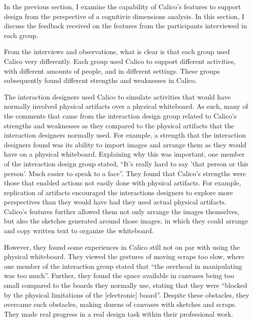 \documentclass[12pt,fleqn]{ucithesis}
\begin{document}
In the previous section, I examine the capability of Calico's features to support design from the perspective of a cognitivie dimensions analysis. In this section, I discuss the feedback received on the features from the participants interviewed in each group.

From the interviews and observations, what is clear is that each group used Calico very differently. Each group used Calico to support different activities, with different amounts of people, and in different settings. These groups subsequently found different strengths and weaknesses in Calico.

The interaction designers used Calico to simulate activities that would have normally involved physical artifacts over a physical whiteboard. As such, many of the comments that came from the interaction design group related to Calico's strengths and weaknesses as they compared to the physical artifacts that the interaction designers normally used. For example, a strength that the interaction designers found was its ability to import images and arrange them as they would have on a physical whiteboard. Explaining why this was important, one member of the interaction design group stated, ``It's really hard to say 'that person or this person'. Much easier to speak to a face''. They found that Calico's strengths were those that enabled actions not easily done with physical artifacts. For example, replication of artifacts encouraged the interactions designers to explore more perspectives than they would have had they used actual physical artifacts. Calico's features further allowed them not only arrange the images themselves, but also the sketches generated around those images, in which they could arrange and copy written text to organize the whiteboard. 

However, they found some experiences in Calico still not on par with using the physical whiteboard. They viewed the gestures of moving scraps too slow, where one member of the interaction group stated that ``the overhead in manipulating was too much''. Further, they found the space available in canvases being too small compared to the boards they normally use, stating that they were ``blocked by the physical limitations of the [electronic] board''. Despite these obstacles, they overcame such obstacles, making dozens of canvases with sketches and scraps. They made real progress in a real design task within their professional work.
\end{document}
